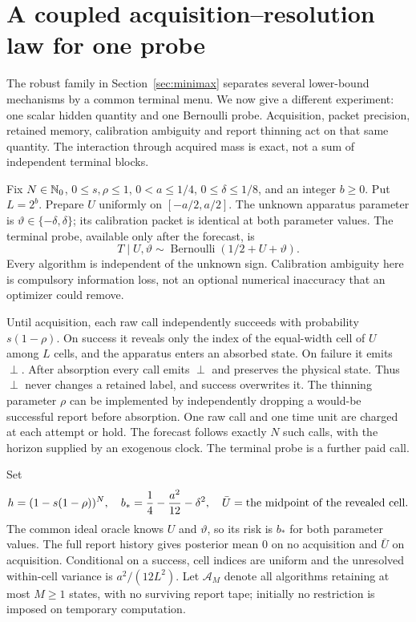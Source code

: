 \section{A coupled acquisition--resolution law for one probe}\label{sec:single-probe}
The robust family in Section~\ref{sec:minimax} separates several lower-bound mechanisms by a common terminal menu. We now give a different experiment: one scalar hidden quantity and one Bernoulli probe. Acquisition, packet precision, retained memory, calibration ambiguity and report thinning act on that same quantity. The interaction through acquired mass is exact, not a sum of independent terminal blocks.

Fix $N\in\mathbb N_0$, $0\le s,\rho\le1$, $0<a\le1/4$, $0\le\delta\le1/8$, and an integer $b\ge0$. Put $L=2^b$. Prepare $U$ uniformly on $[-a/2,a/2]$. The unknown apparatus parameter is $\vartheta\in\{-\delta,\delta\}$; its calibration packet is identical at both parameter values. The terminal probe, available only after the forecast, is
\[
 T\mid U,\vartheta\sim\operatorname{Bernoulli}(1/2+U+\vartheta).
\]
Every algorithm is independent of the unknown sign. Calibration ambiguity here is compulsory information loss, not an optional numerical inaccuracy that an optimizer could remove.

Until acquisition, each raw call independently succeeds with probability $s(1-\rho)$. On success it reveals only the index of the equal-width cell of $U$ among $L$ cells, and the apparatus enters an absorbed state. On failure it emits $\perp$. After absorption every call emits $\perp$ and preserves the physical state. Thus $\perp$ never changes a retained label, and success overwrites it. The thinning parameter $\rho$ can be implemented by independently dropping a would-be successful report before absorption. One raw call and one time unit are charged at each attempt or hold. The forecast follows exactly $N$ such calls, with the horizon supplied by an exogenous clock. The terminal probe is a further paid call.

Set
\begin{equation}\label{eq:single-h}
 h=(1-s(1-\rho))^N,\quad
 b_*={1\over4}-{a^2\over12}-\delta^2,
 \quad \bar U=\hbox{the midpoint of the revealed cell}.
\end{equation}
The common ideal oracle knows $U$ and $\vartheta$, so its risk is $b_*$ for both parameter values. The full report history gives posterior mean $0$ on no acquisition and $\bar U$ on acquisition. Conditional on a success, cell indices are uniform and the unresolved within-cell variance is $a^2/(12L^2)$. Let $\mathcal A_M$ denote all algorithms retaining at most $M\ge1$ states, with no surviving report tape; initially no restriction is imposed on temporary computation.

